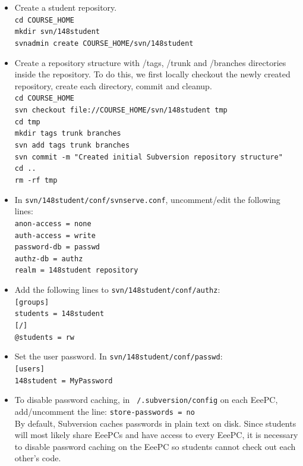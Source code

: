 \begin{itemize}

\item Create a student repository.\\
\texttt{cd COURSE\_HOME}\\
\texttt{mkdir svn/148student}\\
\texttt{svnadmin create COURSE\_HOME/svn/148student}

\item Create a repository structure with /tags, /trunk and /branches directories inside the repository. To do this, we first locally checkout the newly created repository, create each directory, commit and cleanup.\\
\texttt{cd COURSE\_HOME}\\
\texttt{svn checkout file://COURSE\_HOME/svn/148student tmp}\\
\texttt{cd tmp}\\
\texttt{mkdir tags trunk branches}\\
\texttt{svn add tags trunk branches}\\
\texttt{svn commit -m "Created initial Subversion repository structure"}\\
\texttt{cd ..}\\
\texttt{rm -rf tmp}

\item In \texttt{svn/148student/conf/svnserve.conf}, uncomment/edit the following lines:\\
\texttt{anon-access = none}\\
\texttt{auth-access = write}\\
\texttt{password-db = passwd}\\
\texttt{authz-db = authz}\\
\texttt{realm = 148student repository}

\item Add the following lines to \texttt{svn/148student/conf/authz}:\\
\texttt{[groups]}\\
\texttt{students = 148student}\\
\texttt{[/]}\\
\texttt{@students = rw}

\item Set the user password. In \texttt{svn/148student/conf/passwd}:\\
\texttt{[users]}\\
\texttt{148student = MyPassword}

\item To disable password caching, in \texttt{~/.subversion/config} on each EeePC, add/uncomment the line: \texttt{store-passwords = no}\\
By default, Subversion caches passwords in plain text on disk. Since students will most likely share EeePCs and have access to every EeePC, it is necessary to disable password caching on the EeePC so students cannot check out each other's code.


\end{itemize}
